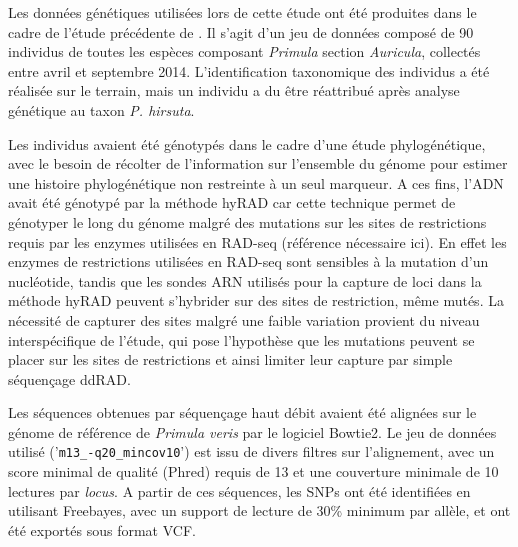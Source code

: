 Les données génétiques utilisées lors de cette étude ont été produites dans le cadre de l'étude précédente de \citet{Boucher2016a}. Il s'agit d'un jeu de données composé de 90 individus de toutes les espèces composant \textit{Primula} section \textit{Auricula}, collectés entre avril et septembre 2014. L'identification taxonomique des individus a été réalisée sur le terrain, mais un individu a du être réattribué après analyse génétique au taxon \textit{P. hirsuta}.

Les individus avaient été génotypés dans le cadre d'une étude phylogénétique, avec le besoin de récolter de l'information sur l'ensemble du génome pour estimer une histoire phylogénétique non restreinte à un seul marqueur. A ces fins, l'ADN avait été génotypé par la méthode hyRAD \citep{Suchan2016} car cette technique permet de génotyper le long du génome malgré des mutations sur les sites de restrictions requis par les enzymes utilisées en RAD-seq (référence nécessaire ici). En effet les enzymes de restrictions utilisées en RAD-seq sont sensibles à la mutation d'un nucléotide, tandis que les sondes ARN utilisés pour la capture de loci dans la méthode hyRAD peuvent s'hybrider sur des sites de restriction, même mutés. La nécessité de capturer des sites malgré une faible variation provient du niveau interspécifique de l'étude, qui pose l'hypothèse que les mutations peuvent se placer sur les sites de restrictions et ainsi limiter leur capture par simple séquençage ddRAD. 

Les séquences obtenues par séquençage haut débit avaient été alignées sur le génome de référence de \textit{Primula veris}
 par le logiciel Bowtie2. Le jeu de données utilisé ('\verb|m13_-q20_mincov10|') est issu de divers filtres sur l'alignement, avec un score minimal de qualité (Phred) requis de 13 et une couverture minimale de 10 lectures par \textit{locus}. A partir de ces séquences, les SNPs ont été identifiées en utilisant Freebayes, avec un support de lecture de 30\% minimum par allèle, et ont été exportés sous format VCF.

